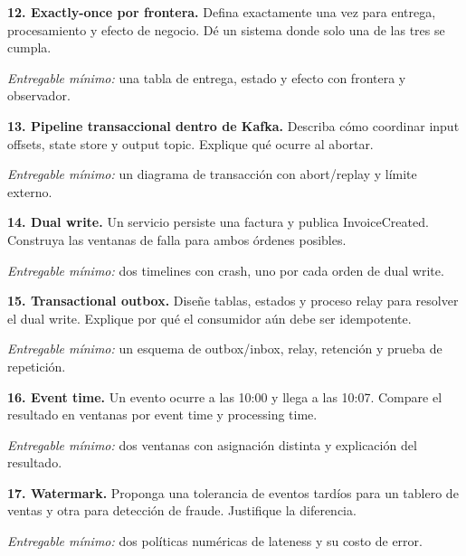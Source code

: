 \documentclass[variant=guia,cover=institutional,mode=screen]{ua-engineering-v6-article}
\begin{document}
\begin{uaexercise}

\textbf{12. Exactly-once por frontera.} Defina exactamente una vez para entrega, procesamiento y efecto de negocio. Dé un sistema donde solo una de las tres se cumpla.

\textit{Entregable mínimo:} una tabla de entrega, estado y efecto con frontera y observador.
\end{uaexercise}
\begin{uaexercise}

\textbf{13. Pipeline transaccional dentro de Kafka.} Describa cómo coordinar input offsets, state store y output topic. Explique qué ocurre al abortar.

\textit{Entregable mínimo:} un diagrama de transacción con abort/replay y límite externo.
\end{uaexercise}
\begin{uaexercise}

\textbf{14. Dual write.} Un servicio persiste una factura y publica InvoiceCreated. Construya las ventanas de falla para ambos órdenes posibles.

\textit{Entregable mínimo:} dos timelines con crash, uno por cada orden de dual write.
\end{uaexercise}
\begin{uaexercise}

\textbf{15. Transactional outbox.} Diseñe tablas, estados y proceso relay para resolver el dual write. Explique por qué el consumidor aún debe ser idempotente.

\textit{Entregable mínimo:} un esquema de outbox/inbox, relay, retención y prueba de repetición.
\end{uaexercise}
\begin{uaexercise}

\textbf{16. Event time.} Un evento ocurre a las 10:00 y llega a las 10:07. Compare el resultado en ventanas por event time y processing time.

\textit{Entregable mínimo:} dos ventanas con asignación distinta y explicación del resultado.
\end{uaexercise}
\begin{uaexercise}

\textbf{17. Watermark.} Proponga una tolerancia de eventos tardíos para un tablero de ventas y otra para detección de fraude. Justifique la diferencia.

\textit{Entregable mínimo:} dos políticas numéricas de lateness y su costo de error.
\end{uaexercise}
\end{document}
